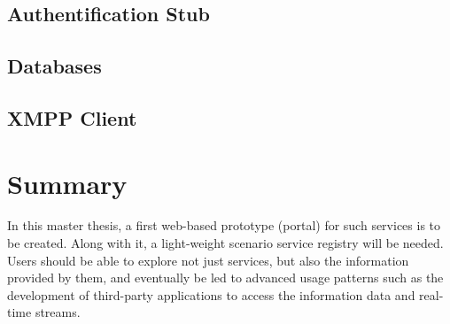 \subsection{Authentification Stub}
\subsection{Databases}
\subsection{XMPP Client}

\section{Summary}
In this master thesis, a first web-based prototype (portal) for such services is to be
created. Along with it, a light-weight scenario service registry will be needed. Users
should be able to explore not just services, but also the information provided by
them, and eventually be led to advanced usage patterns such as the development
of third-party applications to access the information data and real-time streams.